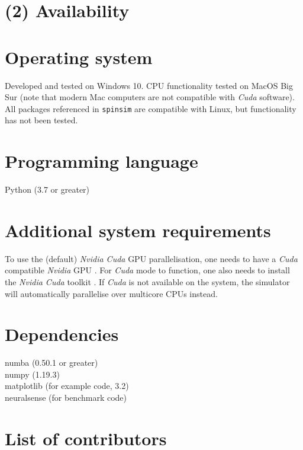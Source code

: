 \documentclass{jors}
\begin{document}
\section{(2) Availability}
\vspace{0.5cm}
\section{Operating system}
Developed and tested on Windows 10. CPU functionality tested on MacOS Big Sur (note that modern Mac computers are not compatible with \emph{Cuda} software). All packages referenced in \texttt{spinsim} are compatible with Linux, but functionality has not been tested.

\section{Programming language}
Python (3.7 or greater)

\section{Additional system requirements}
To use the (default) \emph{Nvidia Cuda} GPU parallelisation, one needs to have a \emph{Cuda} compatible \emph{Nvidia} GPU \cite{noauthor_cuda_2012}. For \emph{Cuda} mode to function, one also needs to install the \emph{Nvidia Cuda} toolkit \cite{noauthor_cuda_2013}. If \emph{Cuda} is not available on the system, the simulator will automatically parallelise over multicore CPUs instead.

\section{Dependencies}
numba (0.50.1 or greater)\\
numpy (1.19.3)\\
matplotlib (for example code, 3.2)\\
neuralsense (for benchmark code)

\section{List of contributors}
\end{document}
